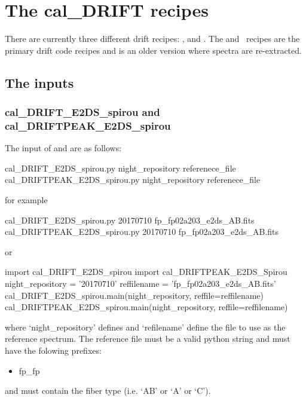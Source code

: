 \clearpage
\newpage
\section{The cal\_DRIFT recipes}
\label{ch:the_recipes:cal_DRIFT_RAW_spirou}

There are currently three different drift recipes: \calDRIFTRAW, \calDRIFTE and \calDRIFTPEAK. The \calDRIFTE and \calDRIFTPEAK\, recipes are the primary drift code recipes and \calDRIFTRAW is an older version where spectra are re-extracted.

\subsection{The inputs}

\subsubsection{cal\_DRIFT\_E2DS\_spirou and cal\_DRIFTPEAK\_E2DS\_spirou}

The input of \calDRIFTE and \calDRIFTPEAK are as follows:
\begin{cmdbox}
cal_DRIFT_E2DS_spirou.py night_repository referenece_file
cal_DRIFTPEAK_E2DS_spirou.py night_repository referenece_file
\end{cmdbox}
\noindent for example
\begin{cmdbox}[title={example}]
cal_DRIFT_E2DS_spirou.py 20170710 fp_fp02a203_e2ds_AB.fits
cal_DRIFTPEAK_E2DS_spirou.py 20170710 fp_fp02a203_e2ds_AB.fits
\end{cmdbox}
\noindent or
\begin{pythonbox}
import cal_DRIFT_E2DS_spirou
import cal_DRIFTPEAK_E2DS_Spirou
night_repository = '20170710'
reffilename = 'fp_fp02a203_e2ds_AB.fits'
cal_DRIFT_E2DS_spirou.main(night_repository, reffile=reffilename)
cal_DRIFTPEAK_E2DS_spirou.main(night_repository, reffile=reffilename)
\end{pythonbox}

\noindent where `night\_repository' defines \argnightname and `refilename' define the file to use as the reference spectrum. The reference file must be a valid python string and must have the folowing prefixes:
\begin{itemize}
	\item fp\_fp
\end{itemize}
\noindent and must contain the fiber type (i.e. `AB' or `A' or `C').

